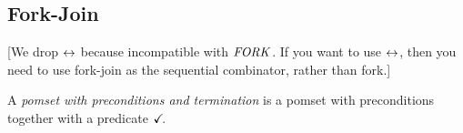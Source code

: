 \begin{comment}
\begin{gather*}
  \PR{x}{r} \SEMI
  \PW{y}{r}
  \\
  \hbox{\begin{tikzinline}[node distance=.5em and 1.5em]
      \xform{xdi}{((1{=}r)\limplies\aForm[r/y])\land \lnot\Q{}}{}
      \xform{xid}{((x{=}r\lor1{=}r)\limplies\aForm[r/y])\land \lnot\Q{}}{below right=.5em and -4em of xdi}
      \event{a1}{\DR{x}{1}}{above=of xdi}
      \event{a2}{((x{=}r\lor1{=}r)\limplies r{=}1) \land\lnot\Q{}\mid\DW{y}{1}}{above=2.7em of xid}
      \xform{xdd}{((1{=}r)\limplies\aForm[r/y])\land (\Q{}\limplies r{=}1)}{above right=.5em and -1em of a1}
      \xform{xii}{((x{=}r\lor1{=}r)\limplies\aForm[r/y])\land \lnot\Q{}}{below=of xid}
      \xo{a1}{xdi}
      \xo{a2}{xid}
      \xo{a1}{xdd}
      \xo{a2}{xdd}
    \end{tikzinline}}
\end{gather*}
With order:
\begin{gather*}
  \hbox{\begin{tikzinline}[node distance=.5em and 1.5em]
      \event{a1}{\DR{x}{1}}{}
      \event{a2}{1{=}r\limplies r{=}1\mid\DW{y}{1}}{right=of a1}
      \po{a1}{a2}
    \end{tikzinline}}
\end{gather*}
\end{comment}



\subsection{Fork-Join}

[We drop $\mathrel\leftrightarrow$ because incompatible with $\sFORK{}$.  If you want to use
$\mathrel\leftrightarrow$, then you need to use fork-join as the sequential combinator,
rather than fork.]

\begin{definition}
  A \emph{pomset with preconditions and termination} is
  a pomset with preconditions together with a predicate $\checkmark\!$.
\end{definition}



